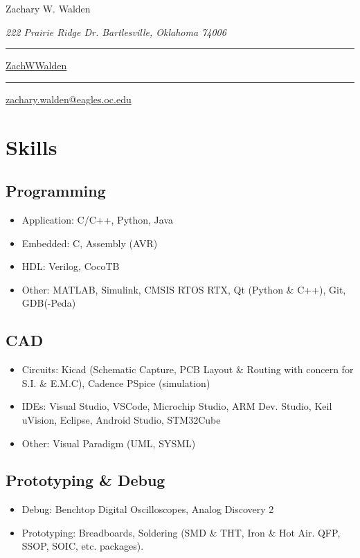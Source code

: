\documentclass{article}
\newcommand\mybar{\kern1pt\rule[-\dp\strutbox]{.8pt}{\baselineskip}\kern1pt}
\begin{document}
\begin{center}
	\begin{Huge}
		Zachary W. Walden\\
	\end{Huge}
	\begin{large}
		\textsl{222 Prairie Ridge Dr. Bartlesville, Oklahoma 74006}\\
	\end{large}
	\begin{small}
		 \mybar { } \faGithub \href{https://github.com/ZachWWalden}{ ZachWWalden}
		\mybar { }\faEnvelope\href{mailto::zachary.walden@eagles.oc.edu}{ zachary.walden@eagles.oc.edu}
	\end{small}
\end{center}
\section{Skills}
	\subsection{Programming}
		\begin{itemize}
			\item Application: C/C++, Python, Java
			\item Embedded: C, Assembly (AVR)
			\item HDL: Verilog, CocoTB
			\item Other: MATLAB, Simulink, CMSIS RTOS RTX, Qt (Python \& C++), Git, GDB(-Peda)
		\end{itemize}
	\subsection{CAD}
		\begin{itemize}
			\item Circuits: Kicad (Schematic Capture, PCB Layout \& Routing with concern for S.I. \& E.M.C), Cadence PSpice (simulation)
			\item IDEs: Visual Studio, VSCode, Microchip Studio, ARM Dev. Studio, Keil uVision, Eclipse, Android Studio, STM32Cube
			\item Other: Visual Paradigm (UML, SYSML)
		\end{itemize}
	\subsection{Prototyping \& Debug}
		\begin{itemize}
			\item Debug: Benchtop Digital Oscilloscopes, Analog Discovery 2
			\item Prototyping: Breadboards, Soldering (SMD \& THT, Iron \& Hot Air. QFP, SSOP, SOIC, etc. packages).
		\end{itemize}
\end{document}
